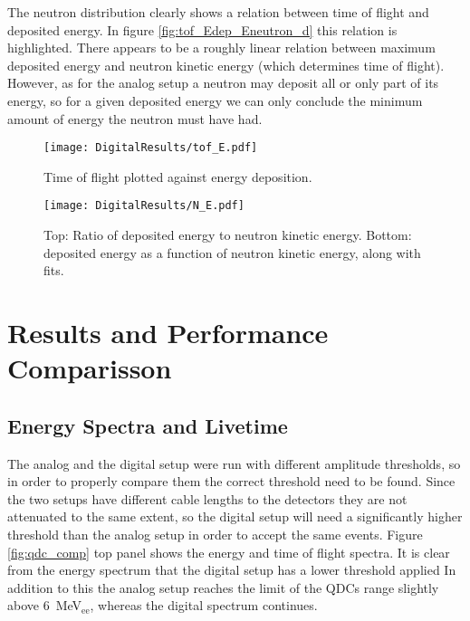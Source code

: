 \documentclass[main.tex]{subfiles}
\begin{document}
The neutron distribution clearly shows a relation between time of flight and deposited energy. In figure \ref{fig:tof_Edep_Eneutron_d} this relation is highlighted. There appears to be a roughly linear relation between maximum deposited energy and neutron kinetic energy (which determines time of flight). However, as for the analog setup a neutron may deposit all or only part of its energy, so for a given deposited energy we can only conclude the minimum amount of energy the neutron must have had.


\begin{figure}[ht]
    \centering
        \texttt{[image: DigitalResults/tof\_E.pdf]}
        \caption{Time of flight plotted against energy deposition.}
    \label{fig:tof_E_d} 
\end{figure}





\begin{figure}[ht]
    \centering
        \texttt{[image: DigitalResults/N\_E.pdf]}
        \caption{Top: Ratio of deposited energy to neutron kinetic energy. Bottom: deposited energy as a function of neutron kinetic energy, along with fits.}
    \label{fig:N_E} 
\end{figure}
\clearpage
\section{Results and Performance Comparisson}\label{sec:comp}
\subsection{Energy Spectra and Livetime}

The analog and the digital setup were run with different amplitude thresholds, so in order to properly compare them the correct threshold need to be found. Since the two setups have different cable lengths to the detectors they are not attenuated to the same extent, so the digital setup will need a significantly higher threshold than the analog setup in order to accept the same events. Figure \ref{fig:qdc_comp} top panel shows the energy and time of flight spectra. It is clear from the energy spectrum that the digital setup has a lower threshold applied In addition to this the analog setup reaches the limit of the QDCs range slightly above \SI{6}{\MeV}$_\text{ee}$, whereas the digital spectrum continues. 
\end{document}
